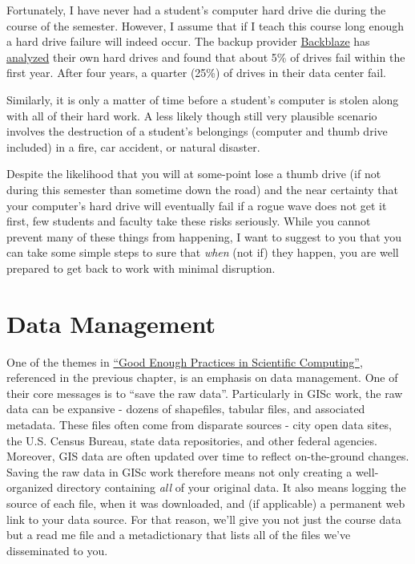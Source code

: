 \documentclass[]{book}
\theoremstyle{definition}
\theoremstyle{definition}
\theoremstyle{definition}
\theoremstyle{remark}
\begin{document}
Fortunately, I have never had a student's computer hard drive die during
the course of the semester. However, I assume that if I teach this
course long enough a hard drive failure will indeed occur. The backup
provider \href{https://www.backblaze.com/}{Backblaze} has
\href{https://www.backblaze.com/blog/how-long-do-disk-drives-last/}{analyzed}
their own hard drives and found that about 5\% of drives fail within the
first year. After four years, a quarter (25\%) of drives in their data
center fail.

Similarly, it is only a matter of time before a student's computer is
stolen along with all of their hard work. A less likely though still
very plausible scenario involves the destruction of a student's
belongings (computer and thumb drive included) in a fire, car accident,
or natural disaster.

Despite the likelihood that you will at some-point lose a thumb drive
(if not during this semester than sometime down the road) and the near
certainty that your computer's hard drive will eventually fail if a
rogue wave does not get it first, few students and faculty take these
risks seriously. While you cannot prevent many of these things from
happening, I want to suggest to you that you can take some simple steps
to sure that \emph{when} (not if) they happen, you are well prepared to
get back to work with minimal disruption.

\section{Data Management}\label{data-management}

One of the themes in \href{https://arxiv.org/abs/1609.00037}{``Good
Enough Practices in Scientific Computing''}, referenced in the previous
chapter, is an emphasis on data management. One of their core messages
is to ``save the raw data''. Particularly in GISc work, the raw data can
be expansive - dozens of shapefiles, tabular files, and associated
metadata. These files often come from disparate sources - city open data
sites, the U.S. Census Bureau, state data repositories, and other
federal agencies. Moreover, GIS data are often updated over time to
reflect on-the-ground changes. Saving the raw data in GISc work
therefore means not only creating a well-organized directory containing
\emph{all} of your original data. It also means logging the source of
each file, when it was downloaded, and (if applicable) a permanent web
link to your data source. For that reason, we'll give you not just the
course data but a read me file and a metadictionary that lists all of
the files we've disseminated to you.
\end{document}
